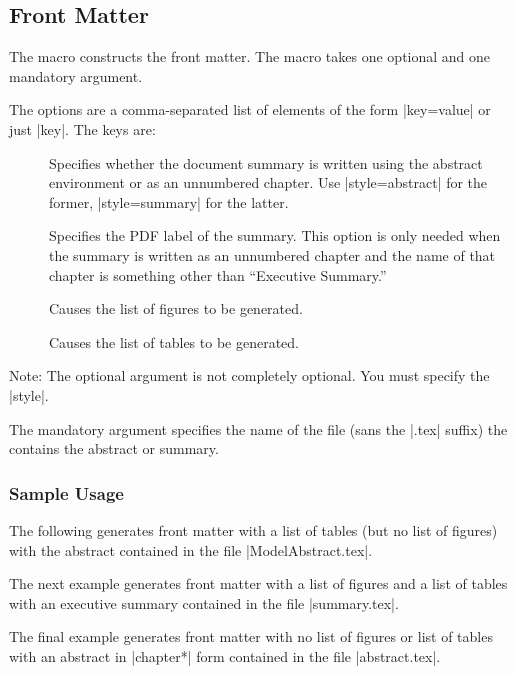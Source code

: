 \subsection{Front Matter}
The  macro constructs the front matter. The macro takes
one optional and one mandatory argument.
\begin{codeblock}
\end{codeblock}
The options are a comma-separated list of elements of the form
|key=value| or just |key|. The keys are:
\begin{description}
\item[] Specifies whether the document summary is written
  using the abstract environment or as an unnumbered chapter.
  Use |style=abstract| for the former, |style=summary| for the latter.
\item[]Specifies the PDF label of the summary.
This option is only needed when the summary is written as an unnumbered chapter
and the name of that chapter is something other than ``Executive Summary.''
\item[] Causes the list of figures to be generated.
\item[] Causes the list of tables to be generated.
\end{description}
Note: The optional argument is not completely optional.
You must specify the |style|.

The mandatory argument specifies the name of the file (sans the |.tex| suffix)
the contains the abstract or summary.

\subsubsection{Sample Usage}
The following generates front matter with a list of tables (but no list of
figures) with the abstract contained in the file |ModelAbstract.tex|.
\begin{codeblock}
\end{codeblock}

The next example generates front matter with a list of figures and a list of
tables with an executive summary contained in the file |summary.tex|.
\begin{codeblock}
\end{codeblock}

The final example generates front matter with no list of figures or list of
tables with an abstract in |chapter*| form contained in the file |abstract.tex|.
\begin{codeblock}
\end{codeblock}

